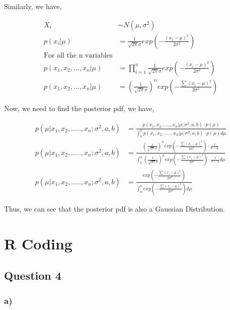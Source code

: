 \documentclass[]{article}
\begin{document}
Similarly, we have,

\begin{align*}
    X_i &\sim N(\mu, \sigma^2) \\
    p(x_i|\mu) &= \frac{1}{\sqrt{2\pi}\sigma} exp\left(-\frac{(x_i - \mu)^2}{2\sigma^2}\right) \\
    \text{For all the n variables} & \\
    p(x_1,x_2,..., x_n | \mu) &= \prod_{i=1}^{n} \frac{1}{\sqrt{2\pi}\sigma} exp\left(-\frac{(x_i - \mu)^2}{2\sigma^2}\right) \\
    p(x_1,x_2,..., x_n | \mu) &= \left(\frac{1}{\sqrt{2\pi}\sigma}\right)^n exp\left(-\frac{\sum (x_i - \mu)^2}{2\sigma^2}\right) 
\end{align*}

Now, we need to find the posterior pdf, we have,

\begin{align*}
    p(\mu | x_1, x_2, ....., x_n; \sigma^2, a,b) &= \frac{p(x_1, x_2, ....., x_n | \mu; \sigma^2, a,b)\cdot p(\mu)}{\int_{a}^{b} p(x_1, x_2, ....., x_n | \mu; \sigma^2, a,b)\cdot p(\mu) d\mu} \\
    p(\mu | x_1, x_2, ....., x_n; \sigma^2, a,b) &= \frac{\left(\frac{1}{\sqrt{2\pi}\sigma}\right)^n exp\left(-\frac{\sum (x_i - \mu)^2}{2\sigma^2}\right) \cdot \frac{1}{b-a}}{\int_{a}^{b} \left(\frac{1}{\sqrt{2\pi}\sigma}\right)^n exp\left(-\frac{\sum (x_i - \mu)^2}{2\sigma^2}\right) \cdot \frac{1}{b-a}d\mu}\\
    p(\mu | x_1, x_2, ....., x_n; \sigma^2, a,b) &= \frac{exp\left(-\frac{\sum (x_i - \mu)^2}{2\sigma^2}\right)}{\int_{a}^{b} exp\left(-\frac{\sum (x_i - \mu)^2}{2\sigma^2}\right) d\mu}
\end{align*}

Thus, we can see that the posterior pdf is also a Gaussian Distribution.

\section{R Coding}\label{r-coding}

\subsection{Question 4}\label{question-4}

\subsubsection{a)}\label{a-2}
\end{document}
